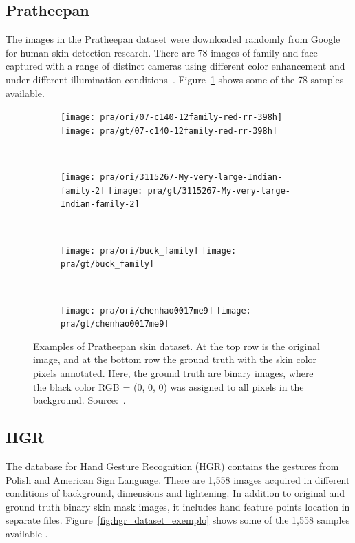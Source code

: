 \subsection{Pratheepan}
\label{sec:datasets_pratheepan}
The images in the Pratheepan dataset were downloaded randomly from Google for human skin detection research. There are 78 images of family and face captured with a range of distinct cameras using different color enhancement and under different illumination conditions~\cite{tan:12}. Figure~\ref{fig:pra_dataset_exemplo} shows some of the 78 samples available.

\begin{figure}[H]
    \centering
    \begin{subfigure}[t]{0.238\textwidth}
        \texttt{[image: pra/ori/07-c140-12family-red-rr-398h]}
        \texttt{[image: pra/gt/07-c140-12family-red-rr-398h]}
    \end{subfigure}
    ~
    \begin{subfigure}[t]{0.25\textwidth}
        \texttt{[image: pra/ori/3115267-My-very-large-Indian-family-2]}
        \texttt{[image: pra/gt/3115267-My-very-large-Indian-family-2]}
    \end{subfigure}
    ~
    \begin{subfigure}[t]{0.25\textwidth}
        \texttt{[image: pra/ori/buck\_family]}
        \texttt{[image: pra/gt/buck\_family]}
    \end{subfigure}
    ~
    \begin{subfigure}[t]{0.141\textwidth}
        \texttt{[image: pra/ori/chenhao0017me9]}
        \texttt{[image: pra/gt/chenhao0017me9]}
    \end{subfigure}
    \caption[Examples of Pratheepan skin dataset]{Examples of Pratheepan skin dataset. At the top row is the original image, and at the bottom row the ground truth with the skin color pixels annotated. Here, the ground truth are binary images, where the black color RGB = (0, 0, 0) was assigned to all pixels in the background. Source:~\citet{tan:12}.}
    \label{fig:pra_dataset_exemplo}
\end{figure}


\subsection{HGR}
\label{sec:datasets_hgr}
The database for Hand Gesture Recognition (HGR) contains the gestures from Polish and American Sign Language. There are 1,558 images acquired in different conditions of background, dimensions and lightening. In addition to original and ground truth binary skin mask images, it includes hand feature points location in separate files. Figure~\ref{fig:hgr_dataset_exemplo} shows some of the 1,558 samples available \citep{kawulok:14, nalepa:14, grzejszczak:16}.

